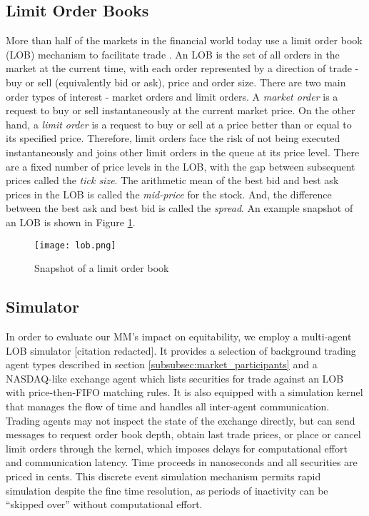 \documentclass[sigconf]{acmart}
\begin{document}
\subsection{Limit Order Books}
More than half of the markets in the financial world today use a limit order book (LOB) mechanism to facilitate trade \cite{gould2013limit,Rosu_adynamic}. An LOB is the set of all orders in the market at the current time, with each order represented by a direction of trade - buy or sell (equivalently bid or ask), price and order size. There are two main order types of interest - market orders and limit orders. A \textit{market order} is a request to buy or sell instantaneously at the current market price. On the other hand, a \textit{limit order} is a request to buy or sell at a price better than or equal to its specified price. Therefore, limit orders face the risk of not being executed instantaneously and joins other limit orders in the queue at its price level. There are a fixed number of price levels in the LOB, with the gap between subsequent prices called the \textit{tick size}. The arithmetic mean of the best bid and best ask prices in the LOB is called the \textit{mid-price} for the stock. And, the difference between the best ask and best bid is called the \textit{spread}. An example snapshot of an LOB is shown in Figure \ref{fig:lob}. \begin{figure}[h]
    \centering
    \texttt{[image: lob.png]}
    \caption{Snapshot of a limit order book}
    \label{fig:lob}
\end{figure}

\subsection{Simulator}
In order to evaluate our MM's impact on equitability, we employ a multi-agent LOB simulator [citation redacted]. It provides a selection of background trading agent types described in section \ref{subsubsec:market_participants} and a NASDAQ-like exchange agent which lists securities for trade against an LOB with price-then-FIFO matching rules. It is also equipped with a simulation kernel that manages the flow of time and handles all inter-agent communication. Trading agents may not inspect the state of the exchange directly, but can send messages to request order book depth, obtain last trade prices, or place or cancel limit orders through the kernel, which imposes delays for computational effort and communication latency. Time proceeds in nanoseconds and all securities are priced in cents. This discrete event simulation mechanism permits rapid simulation despite the fine time resolution, as periods of inactivity can be ``skipped over'' without computational effort.
\end{document}
